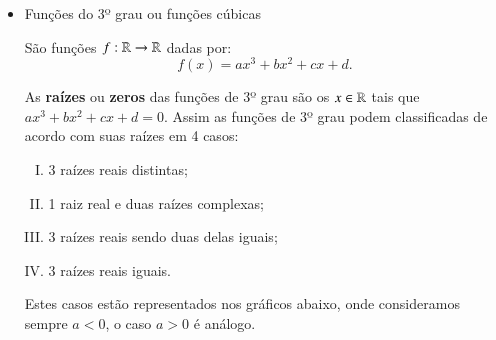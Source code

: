\begin{itemize}
 \newpage
 \item Funções do 3º grau ou funções cúbicas

 São funções $f: \mathbb{R} \rightarrow \mathbb{R}$ dadas por:
 \[f(x)= ax^3 + bx^2 + cx + d .\]

 As \textbf{raízes} ou \textbf{zeros} das funções de 3º grau são os $x \in \mathbb{R}$ tais que $ax^3 + bx^2 + cx + d=0$. Assim as funções de 3º grau podem classificadas de acordo com suas raízes em 4 casos:
 \begin{enumerate}[(I)]
  \item 3 raízes reais distintas;
  \item 1 raiz real e duas raízes complexas;
  \item 3 raízes reais sendo duas delas iguais;
  \item 3 raízes reais iguais.
 \end{enumerate}
 Estes casos estão representados nos gráficos abaixo, onde consideramos sempre $a< 0$, o caso $a> 0$ é análogo.


   \begin{figure}[H]
   \end{figure}


\end{itemize}
